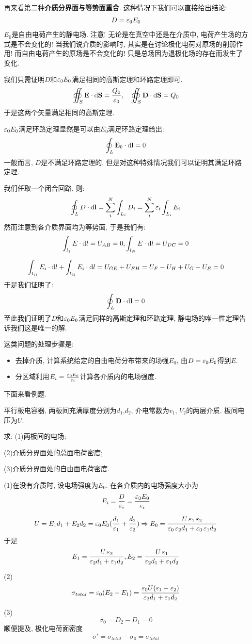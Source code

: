 再来看第二种\textbf{介质分界面与等势面重合}. 这种情况下我们可以直接给出结论:
\[
D = \mathop{}\!\varepsilon_0 E_0
\]
$E_0$是自由电荷产生的静电场. 注意! 无论是在真空中还是在介质中, 电荷产生场的方式是不会变化的! 当我们说介质的影响时, 其实是在讨论极化电荷对原场的削弱作用! 而自由电荷产生的原场是不会变化的! 只是总场因为退极化场的存在而发生了变化.

我们只需证明$D$和$\mathop{}\!\varepsilon_0 E_0$满足相同的高斯定理和环路定理即可.
\[
\oiint_S \mathbf{E} \cdot \mathop{}\!\mathrm{d} \mathbf{S}  = \frac{Q_0}{\mathop{}\!\varepsilon_0},\quad
\oiint_S \mathbf{D} \cdot \mathop{}\!\mathrm{d} \mathbf{S}  = Q_0
\]
于是这两个矢量满足相同的高斯定理.

$\mathop{}\!\varepsilon_0 E_0$满足环路定理显然是可以由$E_0$满足环路定理给出:
\[
\oint_L \mathbf{E}_0 \cdot \mathop{}\!\mathrm{d} \mathbf{l}  = 0
\]
一般而言, $D$是不满足环路定理的, 但是对这种特殊情况我们可以证明其满足环路定理.

我们任取一个闭合回路, 则:
\[
\oint_L D \cdot \mathop{}\!\mathrm{d} \mathbf{l} = \sum_i^N \int_{L_i} D_i = \sum_i^N \mathop{}\!\varepsilon_i \int_{L_i} E_i
\]
然而注意到各介质界面均为等势面, 于是我们有:
\[
\int_{l_1} E \cdot \mathop{}\!\mathrm{d} l =U_{AB} =0, \int_{l_N} E \cdot \mathop{}\!\mathrm{d} l =U_{DC} =0
\]

\[
\int_{l_{i1}} E_i \cdot \mathop{}\!\mathrm{d} l + \int_{l_{i2}} E_i \cdot \mathop{}\!\mathrm{d} l = U_{GE}+U_{FH}=U_F - U_H+U_G-U_E = 0
\]
于是我们证明了:
\[
\oint_L \mathbf{D} \cdot \mathop{}\!\mathrm{d} \mathbf{l}  = 0
\]
至此我们证明了$D$和$\mathop{}\!\varepsilon_0 E_0$满足同样的高斯定理和环路定理, 静电场的唯一性定理告诉我们这是唯一的解.

这类问题的处理步骤是:
\begin{itemize}
  \item 去掉介质, 计算系统给定的自由电荷分布带来的场强$E_0$, 由$D=\mathop{}\!\varepsilon_0 E_0$得到$E$.
  \item 分区域利用$E_i=\frac{\mathop{}\!\varepsilon_0 E_0}{\mathop{}\!\varepsilon_i}$计算各介质内的电场强度.
\end{itemize}

下面来看例题.
\begin{example}
  平行板电容器, 两板间充满厚度分别为$d_1$,$d_2$, 介电常数为$v_1$, $V_2$的两层介质. 板间电压为$U$.

  求: (1)两板间的电场;

  (2)介质分界面处的总面电荷密度;

  (3)介质分界面处的自由面电荷密度.

(1)在没有介质时, 设电场强度为$E_0$. 在各介质内的电场强度大小为
\[
E_i = \frac{D}{\mathop{}\!\varepsilon_i}=\frac{\mathop{}\!\varepsilon_0 E_0}{\mathop{}\!\varepsilon_i}
\]

\[
U=E_1d_1+E_2d_2=\v_0E_0(\frac{d_1}{\v_1}+\frac{d_2}{\v_2})
\Rightarrow E_0 = \frac{U\v_1\v_2}{\v_0\v_2d_1+\v_0\v_1d_2}
\]
于是
\[
E_1=\frac{U\mathop{}\!\varepsilon_2}{\mathop{}\!\varepsilon_2d_1+\mathop{}\!\varepsilon_1d_2},E_2 = \frac{U\mathop{}\!\varepsilon_1}{\mathop{}\!\varepsilon_2d_1+\mathop{}\!\varepsilon_1d_2}
\]

(2)\[
\sigma_{total} = \mathop{}\!\varepsilon_0(E_2-E_1) =\frac{\mathop{}\!\varepsilon_0U(\mathop{}\!\varepsilon_1-\mathop{}\!\varepsilon_2)}{\mathop{}\!\varepsilon_2d_1+\mathop{}\!\varepsilon_1d_2}
\]

(3)\[
\sigma_0 = D_2-D_1 = 0
\]
顺便提及, 极化电荷面密度\[
\sigma' = \sigma_{total} -\sigma_0 = \sigma_{total}
\]
\end{example}
\newpage

